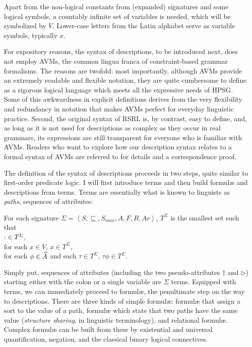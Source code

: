 \documentclass[output=paper
 	        ,biblatex
                ,babelshorthands
                ,newtxmath
                ,draftmode
                ,colorlinks, citecolor=brown
]{langscibook}
\begin{document}
{\begin{exe}
  \ex
\end{exe}

Apart from the non-logical constants from (expanded) signatures and
some logical symbols, a countably infinite set of
variables is needed, which will be symbolized by $V$. Lower-case letters
from the Latin alphabet serve as variable symbols, typically $x$.


For expository reasons, the syntax of descriptions, to be introduced
next, does not employ AVMs, the common
lingua franca of con\-straint-based grammar formalisms. The reasons are
twofold: most importantly, although AVMs provide an extremely readable
and flexible notation, they are quite cumbersome to define as a
rigorous logical language which meets all the expressive needs of HPSG. Some
of this awkwardness in explicit definitions derives from the very
flexibility and redundancy in notation that makes AVMs perfect for
everyday linguistic practice. Second, the original syntax of RSRL
is, by contrast, easy to define, and, as long as it is not used
for descriptions as complex as they occur in real grammars, its expressions are
still transparent for everyone who is familiar with AVMs. Readers who
want to explore how our description syntax relates to a formal syntax
of AVMs are referred to  for details and a
correspondence proof.

The definition of the syntax of descriptions proceeds in two steps,
quite similar to first-order predicate logic. I will first introduce
terms and then build formulæ and descriptions from terms. Terms are essentially
what is known to linguists as \emph{paths}, sequences of attributes:

\begin{mydef}\label{def-terms}
  For each signature $\Sigma=\left<S,\sqsubseteq,S_{max},A,F,R,Ar\right>$,
  $T^{\Sigma}$ is the smallest set such that\\
  $\operatorname{:}\in T^{\Sigma}$,\\
  for each $x\in V$, $x\in T^{\Sigma}$,\\
  for each $\phi \in \widehat{A}$ and each $\tau\in T^{\Sigma}$, $\tau\phi\in T^{\Sigma}$.
\end{mydef}

\noindent
Simply put, sequences of attributes (including the two pseudo-attributes
$\dagger$ and $\triangleright$)
starting either with the colon or a single variable are $\Sigma$ terms.
Equipped with terms, we can immediately proceed to formulæ, the penultimate
step on the way to descriptions.
There are three kinds of simple formulæ: formulæ that assign a sort
to the value of a path, formulæ which state that two paths have the
same value (\emph{structure sharing}, in linguistic terminology), and
relational formulæ. Complex formulæ can be built from these by existential
and universal quantification, negation, and the classical binary logical
connectives.

}
\end{document}
